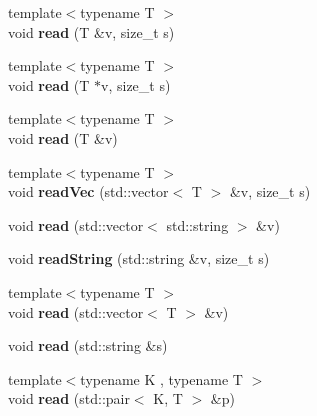 \begin{DoxyCompactItemize}
{\footnotesize template$<$typename T $>$ }\\void {\bfseries read} (T \&v, size\+\_\+t s)
\item 
\hypertarget{classfaster_1_1fastCommBuffer_aad2acb51374cc1fac0bc46ee6810bc50}{}\label{classfaster_1_1fastCommBuffer_aad2acb51374cc1fac0bc46ee6810bc50} 
{\footnotesize template$<$typename T $>$ }\\void {\bfseries read} (T $\ast$v, size\+\_\+t s)
\item 
\hypertarget{classfaster_1_1fastCommBuffer_a69122ec66b22498052126f359c5bd6f4}{}\label{classfaster_1_1fastCommBuffer_a69122ec66b22498052126f359c5bd6f4} 
{\footnotesize template$<$typename T $>$ }\\void {\bfseries read} (T \&v)
\item 
\hypertarget{classfaster_1_1fastCommBuffer_a216070c6f8d5070154a50f40b7896add}{}\label{classfaster_1_1fastCommBuffer_a216070c6f8d5070154a50f40b7896add} 
{\footnotesize template$<$typename T $>$ }\\void {\bfseries read\+Vec} (std\+::vector$<$ T $>$ \&v, size\+\_\+t s)
\item 
\hypertarget{classfaster_1_1fastCommBuffer_a757962624ac8bcc0d6a880ccb7bb03db}{}\label{classfaster_1_1fastCommBuffer_a757962624ac8bcc0d6a880ccb7bb03db} 
void {\bfseries read} (std\+::vector$<$ std\+::string $>$ \&v)
\item 
\hypertarget{classfaster_1_1fastCommBuffer_a41bb4e65b2fb070761be378ce2b3601a}{}\label{classfaster_1_1fastCommBuffer_a41bb4e65b2fb070761be378ce2b3601a} 
void {\bfseries read\+String} (std\+::string \&v, size\+\_\+t s)
\item 
\hypertarget{classfaster_1_1fastCommBuffer_a95cf508e01224680a336c5f20e24ae4a}{}\label{classfaster_1_1fastCommBuffer_a95cf508e01224680a336c5f20e24ae4a} 
{\footnotesize template$<$typename T $>$ }\\void {\bfseries read} (std\+::vector$<$ T $>$ \&v)
\item 
\hypertarget{classfaster_1_1fastCommBuffer_aacf66de0fb075c3a588d86a266c7bb8e}{}\label{classfaster_1_1fastCommBuffer_aacf66de0fb075c3a588d86a266c7bb8e} 
void {\bfseries read} (std\+::string \&s)
\item 
\hypertarget{classfaster_1_1fastCommBuffer_aa53c0eac8725e8a0ea773bd027b7be32}{}\label{classfaster_1_1fastCommBuffer_aa53c0eac8725e8a0ea773bd027b7be32} 
{\footnotesize template$<$typename K , typename T $>$ }\\void {\bfseries read} (std\+::pair$<$ K, T $>$ \&p)
\item 

\end{DoxyCompactItemize}
